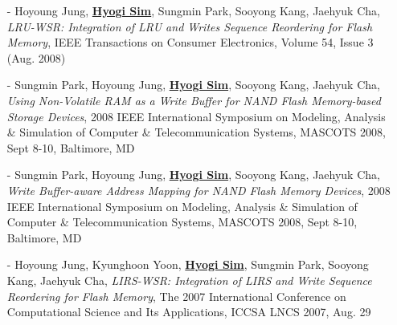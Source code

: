 \begin{itemize}[leftmargin=*]
  {\it Performance Tradeoffs in Using NVRAM Write Buffer for Flash Memory-based
  Storage Devices},
  IEEE Transactions on Computers, Vol. 58, Issue 6 (Jun. 2009) Pages 744-758
\item[-] Hoyoung Jung, \underline{\bf Hyogi Sim}, Sungmin Park, Sooyong Kang, Jaehyuk Cha,
 {\it LRU-WSR: Integration of LRU and Writes Sequence Reordering for Flash
 Memory},
 IEEE Transactions on Consumer Electronics, Volume 54, Issue 3 (Aug. 2008)
\item[-] Sungmin Park, Hoyoung Jung, \underline{\bf Hyogi Sim}, Sooyong Kang, Jaehyuk Cha,
 {\it Using Non-Volatile RAM as a Write Buffer for NAND Flash Memory-based
 Storage Devices},
 2008 IEEE International Symposium on Modeling, Analysis \& Simulation of
 Computer \& Telecommunication Systems, MASCOTS 2008, Sept 8-10, Baltimore, MD
\item[-] Sungmin Park, Hoyoung Jung, \underline{\bf Hyogi Sim}, Sooyong Kang, Jaehyuk Cha,
 {\it Write Buffer-aware Address Mapping for NAND Flash Memory Devices},
 2008 IEEE International Symposium on Modeling, Analysis \& Simulation of
 Computer \& Telecommunication Systems, MASCOTS 2008, Sept 8-10, Baltimore, MD
\item[-] Hoyoung Jung, Kyunghoon Yoon, \underline{\bf Hyogi Sim},
 Sungmin Park, Sooyong Kang, Jaehyuk Cha,
 {\it LIRS-WSR: Integration of LIRS and Write Sequence Reordering for Flash
 Memory},
 The 2007 International Conference on Computational Science and Its
 Applications, ICCSA LNCS 2007, Aug. 29
\end{itemize}

